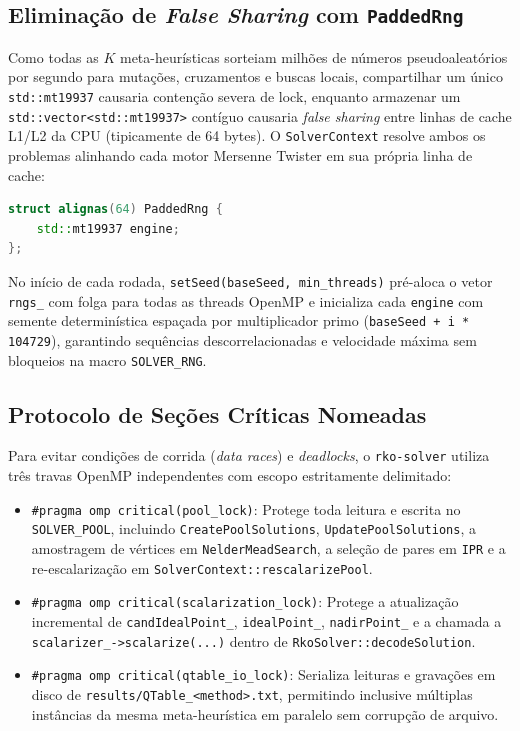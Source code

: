 \documentclass[11pt,a4paper]{article}
\begin{document}
\subsection{Eliminação de \emph{False Sharing} com \texttt{PaddedRng}}

Como todas as $K$ meta-heurísticas sorteiam milhões de números pseudoaleatórios por segundo para mutações, cruzamentos e buscas locais, compartilhar um único \texttt{std::mt19937} causaria contenção severa de lock, enquanto armazenar um \texttt{std::vector<std::mt19937>} contíguo causaria \emph{false sharing} entre linhas de cache L1/L2 da CPU (tipicamente de 64 bytes). O \texttt{SolverContext} resolve ambos os problemas alinhando cada motor Mersenne Twister em sua própria linha de cache:
\begin{lstlisting}[language=C++, caption={Gerador isolado e alinhado em linha de cache de 64 bytes (\texttt{context.hpp}).}]
struct alignas(64) PaddedRng {
    std::mt19937 engine;
};
\end{lstlisting}
No início de cada rodada, \texttt{setSeed(baseSeed, min\_threads)} pré-aloca o vetor \texttt{rngs\_} com folga para todas as threads OpenMP e inicializa cada \texttt{engine} com semente determinística espaçada por multiplicador primo (\texttt{baseSeed + i * 104729}), garantindo sequências descorrelacionadas e velocidade máxima sem bloqueios na macro \texttt{SOLVER\_RNG}.

\subsection{Protocolo de Seções Críticas Nomeadas}

Para evitar condições de corrida (\emph{data races}) e \emph{deadlocks}, o \texttt{rko-solver} utiliza três travas OpenMP independentes com escopo estritamente delimitado:
\begin{itemize}[leftmargin=*]
  \item \texttt{\#pragma omp critical(pool\_lock)}: Protege toda leitura e escrita no \texttt{SOLVER\_POOL}, incluindo \texttt{CreatePoolSolutions}, \texttt{UpdatePoolSolutions}, a amostragem de vértices em \texttt{NelderMeadSearch}, a seleção de pares em \texttt{IPR} e a re-escalarização em \texttt{SolverContext::rescalarizePool}.
  \item \texttt{\#pragma omp critical(scalarization\_lock)}: Protege a atualização incremental de \texttt{candIdealPoint\_}, \texttt{idealPoint\_}, \texttt{nadirPoint\_} e a chamada a \texttt{scalarizer\_->scalarize(...)} dentro de \texttt{RkoSolver::decodeSolution}.
  \item \texttt{\#pragma omp critical(qtable\_io\_lock)}: Serializa leituras e gravações em disco de \texttt{results/QTable\_<method>.txt}, permitindo inclusive múltiplas instâncias da mesma meta-heurística em paralelo sem corrupção de arquivo.
\end{itemize}
\end{document}
